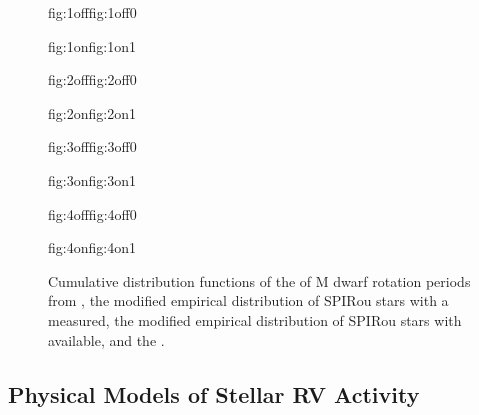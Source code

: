 \begin{figure}
  \centering
  \hspace{-\hsize}%
  \begin{ocg}{fig:1off}{fig:1off}{0}%
  \end{ocg}%
  \begin{ocg}{fig:1on}{fig:1on}{1}%
  \end{ocg}
  \hspace{-\hsize}%
  \begin{ocg}{fig:2off}{fig:2off}{0}%
  \end{ocg}%
  \begin{ocg}{fig:2on}{fig:2on}{1}%
  \end{ocg}
  \hspace{-\hsize}%
  \begin{ocg}{fig:3off}{fig:3off}{0}%
  \end{ocg}%
  \begin{ocg}{fig:3on}{fig:3on}{1}%
  \end{ocg}
  \hspace{-\hsize}%
  \begin{ocg}{fig:4off}{fig:4off}{0}%
  \end{ocg}%
  \begin{ocg}{fig:4on}{fig:4on}{1}%
  \end{ocg}
  \hspace{-\hsize}%
  \caption{Cumulative distribution functions of the 
     of M dwarf rotation periods
    from \cite{newton16a}, the modified empirical distribution of SPIRou stars with a 
     measured, the
    modified empirical distribution of SPIRou stars with
     available, and the
    .}
  \label{BSfig:protcdf}
\end{figure}

\subsection{Physical Models of Stellar RV Activity} \label{BSsect:activity}

